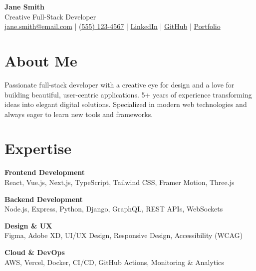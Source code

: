 \documentclass[11pt]{article}
\begin{document}
\begin{center}
    {\Huge \textbf{\color{primarycolor}Jane Smith}} \\
    \vspace{0.2cm}
    {\large Creative Full-Stack Developer} \\
    \vspace{0.2cm}
    \href{mailto:jane.smith@email.com}{jane.smith@email.com} | 
    \href{tel:+15551234567}{(555) 123-4567} | 
    \href{https://linkedin.com/in/janesmith}{LinkedIn} | 
    \href{https://github.com/janesmith}{GitHub} | 
    \href{https://janesmith.dev}{Portfolio}
\end{center}

\vspace{0.3cm}

\section*{About Me}
Passionate full-stack developer with a creative eye for design and a love for building beautiful, user-centric applications. 5+ years of experience transforming ideas into elegant digital solutions. Specialized in modern web technologies and always eager to learn new tools and frameworks.

\vspace{0.2cm}

\section*{Expertise}

\textbf{\color{accentcolor}Frontend Development} \\
React, Vue.js, Next.js, TypeScript, Tailwind CSS, Framer Motion, Three.js

\vspace{0.1cm}

\textbf{\color{accentcolor}Backend Development} \\
Node.js, Express, Python, Django, GraphQL, REST APIs, WebSockets

\vspace{0.1cm}

\textbf{\color{accentcolor}Design \& UX} \\
Figma, Adobe XD, UI/UX Design, Responsive Design, Accessibility (WCAG)

\vspace{0.1cm}

\textbf{\color{accentcolor}Cloud \& DevOps} \\
AWS, Vercel, Docker, CI/CD, GitHub Actions, Monitoring \& Analytics
\end{document}
